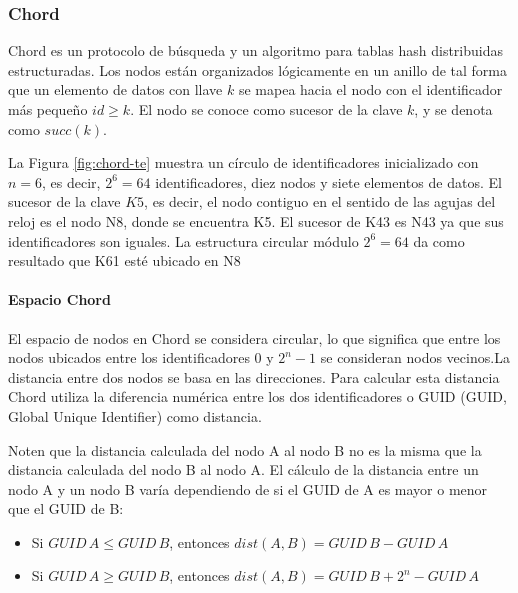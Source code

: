  
 
 
 
 \subsubsection{Chord}
 
 Chord      es un protocolo de búsqueda y un algoritmo para tablas hash distribuidas estructuradas.  Los nodos están organizados lógicamente  en un anillo de tal forma que un elemento de datos con llave $k$ se mapea hacia el nodo con  el identificador más pequeño $id \geq k$. El nodo se conoce como sucesor de la clave $k$, y se denota  como $succ(k)$.
 
 La Figura   \ref{fig:chord-te} muestra un círculo de identificadores inicializado con $n = 6$, es decir, $2^{6} = 64$ identificadores, diez nodos y siete elementos de datos. El sucesor de la clave $K5$, es decir,
 el nodo contiguo en el sentido de las agujas del reloj es el nodo N8, donde se encuentra K5. El sucesor de K43 es N43 ya que sus identificadores son iguales. La estructura circular módulo $2^{6} = 64$  da como resultado que K61 esté ubicado en N8
 
  
 \paragraph{Espacio Chord}
 El espacio de nodos en Chord se considera circular, lo que significa que entre los nodos ubicados entre los identificadores  $0$ y $2^n-1$ se consideran nodos vecinos.La distancia entre dos nodos se basa en las direcciones. Para calcular esta distancia  Chord utiliza la diferencia numérica entre los dos identificadores o  GUID  (GUID, Global Unique Identifier) como distancia. 

 Noten que la  distancia calculada del nodo A al nodo B no es la misma que la distancia calculada del nodo B al nodo A. El cálculo de la distancia entre un nodo A y un nodo B varía dependiendo de si el GUID de A es mayor o menor que el GUID de B:
 
 \begin{itemize}
 	\item  Si \quad $GUID  \,  A  \leq GUID \,   B$, entonces $dist(A, B) = GUID \,  B - GUID \,  A$
 	
 	\item Si \quad $GUID \,  A  \geq GUID \,  B$, entonces $dist(A, B) = GUID \,  B + 2^n - GUID \, A $
 \end{itemize}
 
